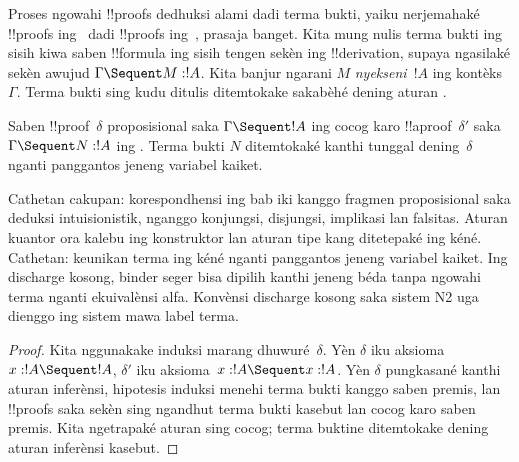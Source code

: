 \documentclass[../../../include/open-logic-section]{subfiles}
\begin{document}


Proses ngowahi !!{proof}s dedhuksi alami dadi terma bukti, yaiku
nerjemahaké !!{proof}s ing~ dadi !!{proof}s ing~,
prasaja banget. Kita mung nulis terma bukti ing sisih kiwa saben
!!{formula} ing sisih tengen sekèn ing !!{derivation}, supaya
ngasilaké sekèn awujud $\Gamma \Sequent M : !A$. Kita banjur
ngarani $M$ \emph{nyekseni}~$!A$ ing kontèks~$\Gamma$. Terma bukti
sing kudu ditulis ditemtokake sakabèhé dening aturan .

\begin{prop}
Saben !!{proof}~$\delta$ proposisional saka $\Gamma \Sequent !A$ ing 
cocog karo !!a{proof}~$\delta'$ saka $\Gamma \Sequent N : !A$ ing
. Terma bukti $N$ ditemtokaké kanthi tunggal dening~$\delta$
nganti panggantos jeneng variabel kaiket.
\end{prop}
Cathetan cakupan: korespondhensi ing bab iki kanggo fragmen proposisional saka deduksi intuisionistik, nganggo konjungsi, disjungsi, implikasi lan falsitas. Aturan kuantor ora kalebu ing konstruktor lan aturan tipe kang ditetepaké ing kéné. Cathetan: keunikan terma ing kéné nganti panggantos jeneng variabel kaiket. Ing discharge kosong, binder seger bisa dipilih kanthi jeneng béda tanpa ngowahi terma nganti ekuivalènsi alfa. Konvènsi discharge kosong saka sistem N2 uga dienggo ing sistem mawa label terma.

\begin{proof}
Kita nggunakake induksi marang dhuwuré~$\delta$. Yèn $\delta$ iku
aksioma $x:!A \Sequent !A$, $\delta'$ iku aksioma~$x:!A \Sequent
x:!A$. Yèn $\delta$ pungkasané kanthi aturan inferènsi, hipotesis
induksi menehi terma bukti kanggo saben premis, lan !!{proof}s
 saka sekèn sing ngandhut terma bukti kasebut lan cocog
karo saben premis. Kita ngetrapaké aturan  sing cocog;
terma buktine ditemtokake dening aturan inferènsi  kasebut.
\end{proof}
\end{document}
